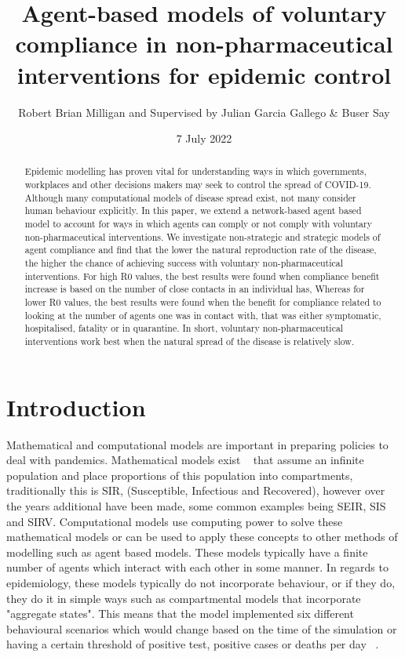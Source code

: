\documentclass{article}
\title{Agent-based models of voluntary compliance in non-pharmaceutical interventions for epidemic control}
\author{Robert Brian Milligan and Supervised by Julian Garcia Gallego \& Buser Say}
\date{7 July 2022}
\begin{document}
\maketitle

\begin{abstract}
Epidemic modelling has proven vital for understanding ways in which governments, workplaces and other decisions makers may seek to control the spread of COVID-19. Although many computational models of disease spread exist, not many consider human behaviour explicitly. In this paper, we extend a network-based agent based model to account for ways in which agents can comply or not comply with voluntary non-pharmaceutical interventions. We investigate non-strategic and strategic models of agent compliance and find that the lower the natural reproduction rate of the disease, the higher the chance of achieving success with voluntary non-pharmaceutical interventions. For high R0 values, the best results were found when compliance benefit increase is based on the number of close contacts in an individual has, Whereas for lower R0 values, the best results were found when the benefit for compliance related to looking at the number of agents one was in contact with, that was either symptomatic, hospitalised, fatality or in quarantine. In short, voluntary non-pharmaceutical interventions work best when the natural spread of the disease is relatively slow.
\end{abstract}



\tableofcontents

\newpage 

\section{Introduction}

Mathematical and computational models are important in preparing policies to deal with pandemics. Mathematical models exist ~\cite{cooper_mondal_antonopoulos_2020} that assume an infinite population and place proportions of this population into compartments, traditionally this is SIR, (Susceptible, Infectious and Recovered), however over the years additional have been made, some common examples being SEIR, SIS and SIRV. Computational models use computing power to solve these mathematical models or can be used to apply these concepts to other methods of modelling such as agent based models. These models typically have a finite number of agents which interact with each other in some manner. In regards to epidemiology, these models typically do not incorporate behaviour, or if they do, they do it in simple ways such as compartmental models that incorporate "aggregate states". This means that the model implemented six different behavioural scenarios which would change based on the time of the simulation or having a certain threshold of positive test, positive cases or deaths per day ~\cite{karaivanov_2020}.\linebreak
\end{document}
